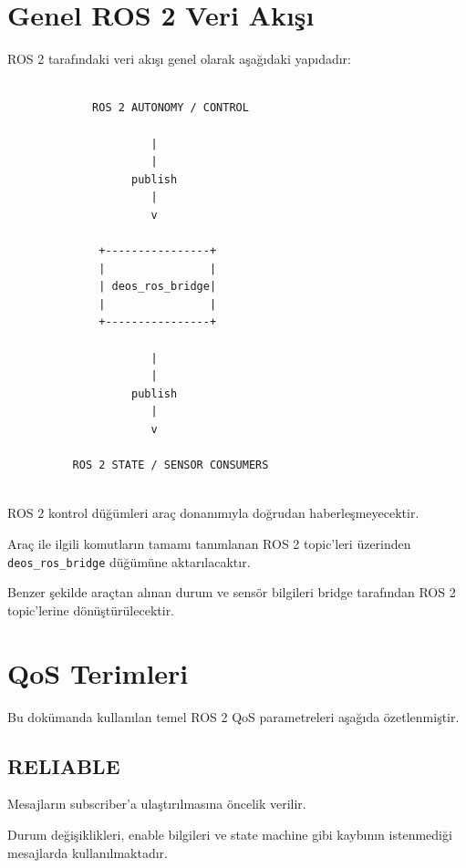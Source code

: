 \documentclass[12pt,a4paper]{article}
\begin{document}
\section{Genel ROS 2 Veri Akışı}

ROS 2 tarafındaki veri akışı genel olarak aşağıdaki yapıdadır:

\begin{verbatim}

             ROS 2 AUTONOMY / CONTROL

                      |
                      |
                   publish
                      |
                      v

              +----------------+
              |                |
              | deos_ros_bridge|
              |                |
              +----------------+

                      |
                      |
                   publish
                      |
                      v

          ROS 2 STATE / SENSOR CONSUMERS


\end{verbatim}

ROS 2 kontrol düğümleri araç donanımıyla doğrudan haberleşmeyecektir.

Araç ile ilgili komutların tamamı tanımlanan ROS 2 topic'leri üzerinden
\texttt{deos\_ros\_bridge} düğümüne aktarılacaktır.

Benzer şekilde araçtan alınan durum ve sensör bilgileri bridge tarafından
ROS 2 topic'lerine dönüştürülecektir.

\section{QoS Terimleri}

Bu dokümanda kullanılan temel ROS 2 QoS parametreleri aşağıda
özetlenmiştir.

\subsection{RELIABLE}

Mesajların subscriber'a ulaştırılmasına öncelik verilir.

Durum değişiklikleri, enable bilgileri ve state machine gibi kaybının
istenmediği mesajlarda kullanılmaktadır.
\end{document}
